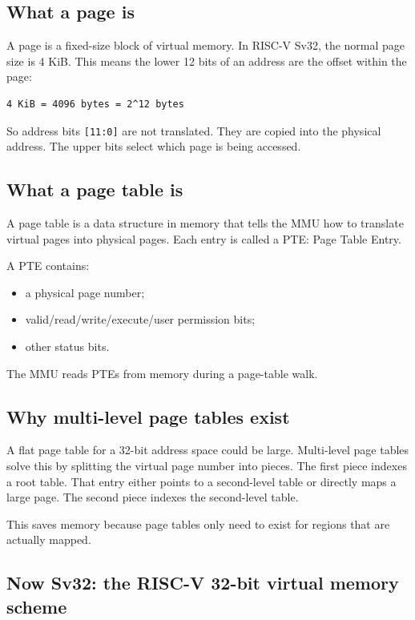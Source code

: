 \subsection{What a page is}

A page is a fixed-size block of virtual memory. In RISC-V Sv32, the normal page size is 4 KiB. This means the lower 12 bits of an address are the offset within the page:

\begin{lstlisting}[language={}]
4 KiB = 4096 bytes = 2^12 bytes
\end{lstlisting}

So address bits \texttt{[11:0]} are not translated. They are copied into the physical address. The upper bits select which page is being accessed.

\subsection{What a page table is}

A page table is a data structure in memory that tells the MMU how to translate virtual pages into physical pages. Each entry is called a PTE: Page Table Entry.

A PTE contains:

\begin{itemize}
\item a physical page number;
\item valid/read/write/execute/user permission bits;
\item other status bits.
\end{itemize}
The MMU reads PTEs from memory during a page-table walk.

\subsection{Why multi-level page tables exist}

A flat page table for a 32-bit address space could be large. Multi-level page tables solve this by splitting the virtual page number into pieces. The first piece indexes a root table. That entry either points to a second-level table or directly maps a large page. The second piece indexes the second-level table.

This saves memory because page tables only need to exist for regions that are actually mapped.

\subsection{Now Sv32: the RISC-V 32-bit virtual memory scheme}

